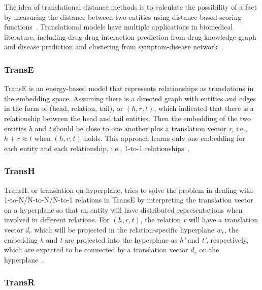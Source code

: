 The idea of translational distance methods is to calculate the possibility of a fact by measuring the distance between two entities using distance-based scoring functions~\cite{wang_knowledge_2017}.
Translational models have multiple applications in biomedical literature, including drug-drug interaction prediction from drug knowledge graph~\cite{abdelaziz_large-scale_2017, wang_predicting_2017} and disease prediction and clustering from symptom-disease network~\cite{zhao_contextcare:_2017}.

\subsubsection{TransE}

TransE is an energy-based model that represents relationships as translations in the embedding space.
Assuming there is a directed graph with entities and edges in the form of (head, relation, tail), or $(h, r, t)$, which indicated that there is a relationship between the head and tail entities.
Then the embedding of the two entities \textit{h} and \textit{t} should be close to one another plus a translation vector \textit{r}, i.e., $h + r \approx t$ when $(h, r, t)$ holds.
This approach learns only one embedding for each entity and each relationship, i.e., 1-to-1 relationships~\cite{bordes_translating_2013}.

\subsubsection{TransH}
TransH, or translation on hyperplane, tries to solve the problem in dealing with 1-to-N/N-to-N/N-to-1 relations in TransE by interpreting the translation vector on a hyperplane so that an entity will have distributed representations when involved in different relations.
For $(h, r, t)$, the relation \textit{r} will have a translation vector $d_{r}$ which will be projected in the relation-specific hyperplane $w_{r}$, the embedding \textit{h} and \textit{t} are projected into the hyperplane as \textit{h’} and \textit{t’}, respectively, which are expected to be connected by a translation vector $d_{r}$ on the hyperplane~\cite{wang_knowledge_2014}.

\subsubsection{TransR}


